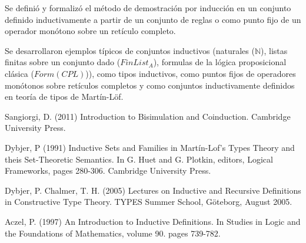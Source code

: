 \documentclass[11pt,oneside]{report}
\theoremstyle{plain}
\theoremstyle{definition}
\newcommand{\N}{\mathbb{N}}
\begin{document}
Se definió y formalizó el método de demostración por inducción en un conjunto definido inductivamente a partir de un conjunto de reglas o como punto fijo de un operador monótono sobre un retículo completo.

Se desarrollaron ejemplos típicos de conjuntos inductivos (naturales ($\N$), listas finitas sobre un conjunto dado ($FinList_A$), formulas de la lógica proposicional clásica ($Form(CPL)$)), como tipos inductivos, como puntos fijos de operadores monótonos sobre retículos completos y como conjuntos inductivamente definidos en teoría de tipos de Martín-Löf.

\begin{thebibliography}{9}
    Sangiorgi, D. (2011)
    Introduction to Bisimulation and Coinduction.
    Cambridge University Press.
    
    Dybjer, P (1991)
    Inductive Sets and Families in Martín-Lof's Types Theory and theis Set-Theoretic Semantics. In G. Huet and G. Plotkin, editors, Logical Frameworks, pages 280-306. Cambridge University Press.
    
    Dybjer, P. Chalmer, T. H. (2005)
    Lectures on Inductive and Recursive Definitions in Constructive Type Theory. TYPES Summer School, Göteborg, August 2005.

    Aczel, P. (1997)
    An Introduction to Inductive Definitions. In Studies in Logic and the Foundations of Mathematics, volume 90. pages 739-782.
\end{thebibliography}
\end{document}
